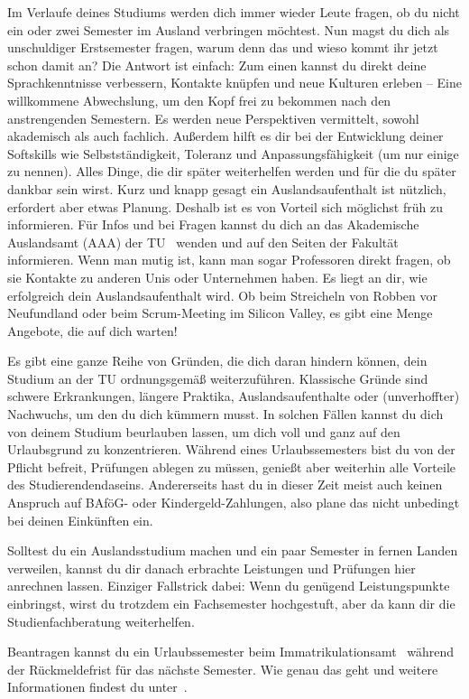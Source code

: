 Im Verlaufe deines Studiums werden dich immer wieder Leute fragen, ob du nicht ein oder zwei Semester im Ausland verbringen möchtest.
Nun magst du dich als unschuldiger Erstsemester fragen, warum denn das und wieso kommt ihr jetzt schon damit an?
Die Antwort ist einfach:
Zum einen kannst du direkt deine Sprachkenntnisse verbessern, Kontakte knüpfen und neue Kulturen erleben -- Eine willkommene Abwechslung, um den Kopf frei zu bekommen nach den anstrengenden Semestern. Es werden neue Perspektiven vermittelt, sowohl akademisch als auch fachlich. Außerdem hilft es dir bei der Entwicklung deiner Softskills wie Selbstständigkeit, Toleranz und Anpassungsfähigkeit (um nur einige zu nennen). Alles Dinge, die dir später weiterhelfen werden und für die du später dankbar sein wirst.
Kurz und knapp gesagt ein Auslandsaufenthalt ist nützlich, erfordert aber etwas Planung.
Deshalb ist es von Vorteil sich möglichst früh zu informieren.
Für Infos und bei Fragen kannst du dich an das Akademische Auslandsamt (AAA) der TU~ wenden und auf den Seiten der Fakultät~ informieren.
Wenn man mutig ist, kann man sogar Professoren direkt fragen, ob sie Kontakte zu anderen Unis oder Unternehmen haben.
Es liegt an dir, wie erfolgreich dein Auslandsaufenthalt wird.
Ob beim Streicheln von Robben vor Neufundland oder beim Scrum-Meeting im Silicon Valley, es gibt eine Menge Angebote, die auf dich warten!


Es gibt eine ganze Reihe von Gründen, die dich daran hindern können, dein Studium an der TU ordnungsgemäß weiterzuführen.
Klassische Gründe sind schwere Erkrankungen, längere Praktika, Auslandsaufenthalte oder (unverhoffter) Nachwuchs, um den du dich kümmern musst.
In solchen Fällen kannst du dich von deinem Studium beurlauben lassen, um dich voll und ganz auf den Urlaubsgrund zu konzentrieren.
Während eines Urlaubssemesters bist du von der Pflicht befreit, Prüfungen ablegen zu müssen, genießt aber weiterhin alle Vorteile des Studierendendaseins.
Andererseits hast du in dieser Zeit meist auch keinen Anspruch auf BAföG- oder Kindergeld-Zahlungen, also plane das nicht unbedingt bei deinen Einkünften ein.

Solltest du ein Auslandsstudium machen und ein paar Semester in fernen Landen verweilen, kannst du dir danach erbrachte Leistungen und Prüfungen hier anrechnen lassen.
Einziger Fallstrick dabei: Wenn du genügend Leistungspunkte einbringst, wirst du trotzdem ein Fachsemester hochgestuft, aber da kann dir die Studienfachberatung weiterhelfen.

Beantragen kannst du ein Urlaubssemester beim Immatrikulationsamt~ während der Rückmeldefrist für das nächste Semester.
Wie genau das geht und weitere Informationen findest du unter~.
